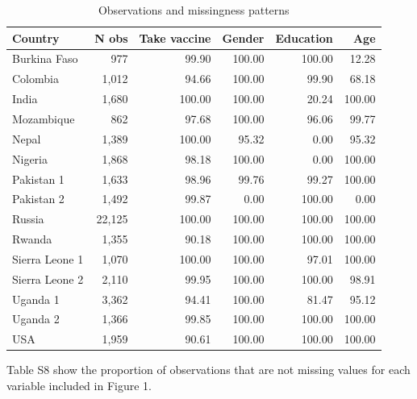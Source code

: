 \documentclass[
  12pt,
]{article}
\begin{document}
\begin{table}

\caption{Observations and missingness patterns}
\centering
\fontsize{10}{12}\selectfont
\begin{threeparttable}
\begin{tabular}[t]{lrrrrr}
\toprule
Country & N obs & Take vaccine & Gender & Education & Age\\
\midrule
Burkina Faso & 977 & 99.90 & 100.00 & 100.00 & 12.28\\
Colombia & 1,012 & 94.66 & 100.00 & 99.90 & 68.18\\
India & 1,680 & 100.00 & 100.00 & 20.24 & 100.00\\
Mozambique & 862 & 97.68 & 100.00 & 96.06 & 99.77\\
Nepal & 1,389 & 100.00 & 95.32 & 0.00 & 95.32\\
Nigeria & 1,868 & 98.18 & 100.00 & 0.00 & 100.00\\
Pakistan 1 & 1,633 & 98.96 & 99.76 & 99.27 & 100.00\\
Pakistan 2 & 1,492 & 99.87 & 0.00 & 100.00 & 0.00\\
Russia & 22,125 & 100.00 & 100.00 & 100.00 & 100.00\\
Rwanda & 1,355 & 90.18 & 100.00 & 100.00 & 100.00\\
Sierra Leone 1 & 1,070 & 100.00 & 100.00 & 97.01 & 100.00\\
Sierra Leone 2 & 2,110 & 99.95 & 100.00 & 100.00 & 98.91\\
Uganda 1 & 3,362 & 94.41 & 100.00 & 81.47 & 95.12\\
Uganda 2 & 1,366 & 99.85 & 100.00 & 100.00 & 100.00\\
USA & 1,959 & 90.61 & 100.00 & 100.00 & 100.00\\
\bottomrule
\end{tabular}
\begin{tablenotes}
\item Table S8 show the proportion of observations that are not missing values for each variable included in Figure 1.
\end{tablenotes}
\end{threeparttable}
\end{table}

\newpage
\end{document}
